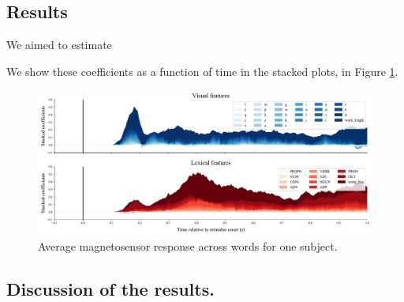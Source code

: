 \subsection{Results}

We aimed to estimate

We show these coefficients as a function of time in the stacked plots, in Figure
\ref{fig:megresult}.

\begin{figure}
  \centering
  \includegraphics[width=\textwidth, trim=0cm 0cm 0cm 0cm, clip=True]{figures/meg_result.pdf}
  \caption{Average magnetosensor response across words for one subject.}
  \label{fig:megresult}
\end{figure}



\subsection{Discussion of the results.}
